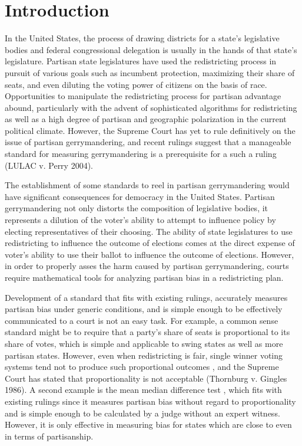\documentclass[preprint,12pt]{article}
\begin{document}
\section{Introduction}
In the United States, the process of drawing districts for a state's legislative bodies and federal congressional delegation is usually in the hands of that state's legislature.
Partisan state legislatures have used the redistricting process in pursuit of various goals such as incumbent protection, maximizing their share of seats, and even diluting the voting power of citizens on the basis of race.
Opportunities to manipulate the redistricting process for partisan advantage abound, particularly with the advent of sophisticated algorithms for redistricting as well as a high degree of partisan and geographic polarization in the current political climate.
However, the Supreme Court has yet to rule definitively on the issue of partisan gerrymandering, and recent rulings suggest that a manageable standard for measuring gerrymandering is a prerequisite for a such a ruling (LULAC v. Perry 2004).

The establishment of some standards to reel in partisan gerrymandering would have significant consequences for democracy in the United States.
Partisan gerrymandering not only distorts the composition of legislative bodies, it represents a dilution of the voter's ability to attempt to influence policy by electing representatives of their choosing.
The ability of state legislatures to use redistricting to influence the outcome of elections comes at the direct expense of voter's ability to use their ballot to influence the outcome of elections.
However, in order to properly asses the harm caused by partisan gerrymandering, courts require mathematical tools for analyzing partisan bias in a redistricting plan.

Development of a standard that fits with existing rulings, accurately measures partisan bias under generic conditions, and is simple enough to be effectively communicated to a court is not an easy task.
For example, a common sense standard might be to require that a party's share of seats is proportional to its share of votes, which is simple and applicable to swing states as well as more partisan states.
However, even when redistricting is fair, single winner voting systems tend not to produce such proportional outcomes \cite{Kendall_1950_10.2307/588113}, and the Supreme Court has stated that proportionality is not acceptable (Thornburg v. Gingles 1986).
A second example is the mean median difference test \cite{Wang__,Wang_2016_10.1089/elj.2016.0387,McDonald_2015_10.1089/elj.2015.0358}, which fits with existing rulings since it measures partisan bias without regard to proportionality and is simple enough to be calculated by a judge without an expert witness.
However, it is only effective in measuring bias for states which are close to even in terms of partisanship. \cite{Wang_2016_10.1089/elj.2016.0387}
\end{document}
